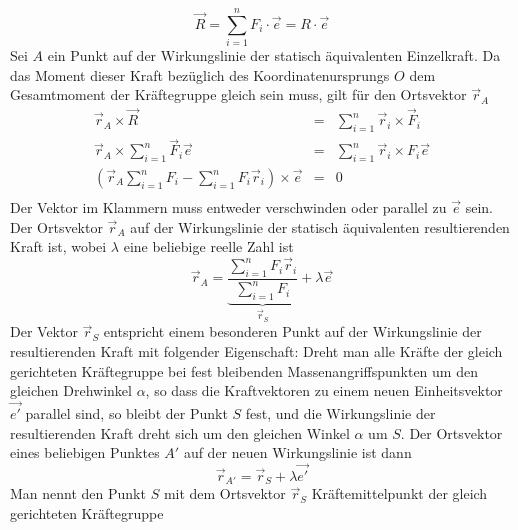 \begin{equation}
\boxed{\overrightarrow{R}=\displaystyle \sum_{i=1}^nF_i\cdot\overrightarrow{e}=R\cdot \overrightarrow{e}}
\end{equation}
Sei $A$ ein Punkt auf der Wirkungslinie der statisch äquivalenten Einzelkraft. Da das Moment dieser Kraft bezüglich des Koordinatenursprungs $O$ dem Gesamtmoment der Kräftegruppe gleich sein muss, gilt für den Ortsvektor $\overrightarrow{r}_A$
\begin{equation}
\boxed{\begin{array}{lll}
\overrightarrow{r}_A\times \overrightarrow{R}&=&\displaystyle \sum_{i=1}^n\overrightarrow{r}_i\times \overrightarrow{F}_i\\
\overrightarrow{r}_A\times \displaystyle \sum_{i=1}^n\overrightarrow{F}_i\overrightarrow{e}&=&\displaystyle \sum_{i=1}^n\overrightarrow{r}_i\times F_i\overrightarrow{e}\\
\left(\overrightarrow{r}_A\displaystyle \sum_{i=1}^nF_i-\displaystyle \sum_{i=1}^nF_i\overrightarrow{r}_i\right)\times \overrightarrow{e}&=&0\\
\end{array}}
\end{equation}
Der Vektor im Klammern muss entweder verschwinden oder parallel zu $\overrightarrow{e}$ sein. Der Ortsvektor $\overrightarrow{r}_A$ auf der Wirkungslinie der statisch äquivalenten resultierenden Kraft ist, wobei $\lambda$ eine beliebige reelle Zahl ist
\begin{equation}
\boxed{\overrightarrow{r}_A=\underbrace{\dfrac{\displaystyle \sum_{i=1}^nF_i\overrightarrow{r}_i}{\displaystyle \sum_{i=1}^nF_i}}_{\overrightarrow{r}_S}+\lambda \overrightarrow{e}}
\end{equation}
Der Vektor $\overrightarrow{r}_S$ entspricht einem besonderen Punkt auf der Wirkungslinie der resultierenden Kraft mit folgender Eigenschaft: Dreht man alle Kräfte der gleich gerichteten Kräftegruppe bei fest bleibenden Massenangriffspunkten um den gleichen Drehwinkel $\alpha$, so dass die Kraftvektoren zu einem neuen Einheitsvektor $\overrightarrow{e'}$ parallel sind, so bleibt der Punkt $S$ fest, und die Wirkungslinie der resultierenden Kraft dreht sich um den gleichen Winkel $\alpha$ um $S$. Der Ortsvektor eines beliebigen Punktes $A'$ auf der neuen Wirkungslinie ist dann
\begin{equation}
\boxed{\overrightarrow{r}_{A'}=\overrightarrow{r}_S+\lambda \overrightarrow{e'}}
\end{equation}
Man nennt den Punkt $S$ mit dem Ortsvektor $\overrightarrow{r}_S$ Kräftemittelpunkt der gleich gerichteten Kräftegruppe
